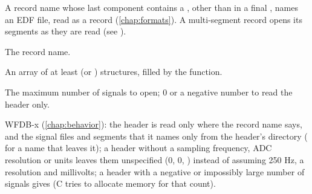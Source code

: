 A record name whose last component contains a , other than in a
final , names an EDF file, read as a record (\cref{chap:formats}). A multi-segment
record opens its segments as they are read (see ).
\begin{params}
\item[record] The record name.
\item[siarray] An array of at least  (or )
   structures, filled by the function.
\item[nsig] The maximum number of signals to open; 0 or a negative number to
  read the header only.
\end{params}

WFDB-x (\cref{chap:behavior}): the header is read only where the record name
says, and the signal files and segments that it names only from the header's
directory ( for a name that leaves it); a header without a
sampling frequency, ADC resolution or units leaves them unspecified (0, 0,
) instead of assuming 250 Hz, a resolution and millivolts; a header
with a negative or impossibly large number of signals gives  (C tries to allocate memory for
that count).

